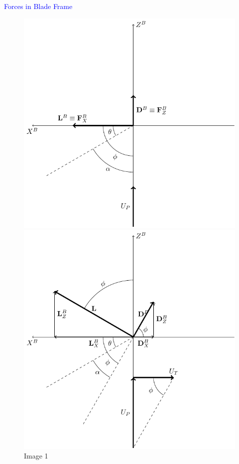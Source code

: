 \textcolor{blue}{Forces in Blade Frame}

\begin{figure}[!htb]
    \centering
    \begin{minipage}{0.45\textwidth}
        \centering
        \includegraphics[width=\linewidth]{Figures/implementation/bet/blade_forces/blade_element_forces_1.pdf} %
        \caption{Image 1}
    \end{minipage}
    \hfill
    \begin{minipage}{0.45\textwidth}
        \centering
        \includegraphics[width=\linewidth]{Figures/implementation/bet/blade_forces/blade_element_forces_2.pdf} %

\end{minipage}
\end{figure}
